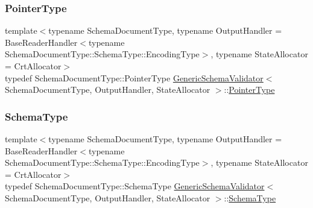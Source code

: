 \mbox{\label{classGenericSchemaValidator_ae0c6c9a9c0ff6bae80e75c6705f2668b}} 
\subsubsection{\texorpdfstring{Pointer\+Type}{PointerType}}
{\footnotesize\ttfamily template$<$typename Schema\+Document\+Type, typename Output\+Handler = Base\+Reader\+Handler$<$typename Schema\+Document\+Type\+::\+Schema\+Type\+::\+Encoding\+Type$>$, typename State\+Allocator = Crt\+Allocator$>$ \\
typedef Schema\+Document\+Type\+::\+Pointer\+Type \hyperlink{classGenericSchemaValidator}{Generic\+Schema\+Validator}$<$ Schema\+Document\+Type, Output\+Handler, State\+Allocator $>$\+::\hyperlink{classGenericSchemaValidator_ae0c6c9a9c0ff6bae80e75c6705f2668b}{Pointer\+Type}}

\mbox{\label{classGenericSchemaValidator_ac79628f00f6720bbabb70b44f0d076a0}} 
\subsubsection{\texorpdfstring{Schema\+Type}{SchemaType}}
{\footnotesize\ttfamily template$<$typename Schema\+Document\+Type, typename Output\+Handler = Base\+Reader\+Handler$<$typename Schema\+Document\+Type\+::\+Schema\+Type\+::\+Encoding\+Type$>$, typename State\+Allocator = Crt\+Allocator$>$ \\
typedef Schema\+Document\+Type\+::\+Schema\+Type \hyperlink{classGenericSchemaValidator}{Generic\+Schema\+Validator}$<$ Schema\+Document\+Type, Output\+Handler, State\+Allocator $>$\+::\hyperlink{classGenericSchemaValidator_ac79628f00f6720bbabb70b44f0d076a0}{Schema\+Type}}

\mbox{\label{classGenericSchemaValidator_a604160fcd6af7582e0deccc205309dcf}} 
